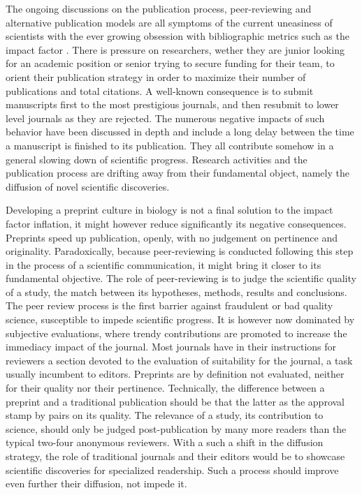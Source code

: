 \documentclass[letterpaper,twocolumn,superscriptaddress,showkeys,longbibliography]{revtex4-1}
\begin{document}
The ongoing discussions on the publication process, peer-reviewing and
alternative publication models are all symptoms of the current uneasiness of
scientists with the ever growing obsession with bibliographic metrics such as
the impact factor \cite{Fisher2012}. There is pressure on researchers, wether
they are junior looking for an academic position or senior trying to secure
funding for their team, to orient their publication strategy in order to
maximize their number of publications and total citations. A well-known
consequence is to submit manuscripts first to the most prestigious journals, and
then resubmit to lower level journals as they are rejected. The numerous
negative impacts of such behavior have been discussed in depth \cite{hoc09} and
include a long delay between the time a manuscript is finished to its
publication.  They all contribute somehow in a general slowing down of
scientific progress.  Research activities and the publication process are
drifting away from their fundamental object, namely the diffusion of novel
scientific discoveries. 

Developing a preprint culture in biology is not a final solution to the impact
factor inflation, it might however reduce significantly its negative
consequences. Preprints speed up publication, openly, with no judgement on
pertinence and originality. Paradoxically, because peer-reviewing is conducted
following this step in the process of a scientific communication, it might bring
it closer to its fundamental objective. The role of peer-reviewing is to judge
the scientific quality of a study, the match between its hypotheses, methods,
results and conclusions. The peer review process is the first barrier against
fraudulent or bad quality science, susceptible to impede scientific progress. It
is however now dominated by subjective evaluations, where trendy contributions
are promoted to increase the immediacy impact of the journal. Most journals have
in their instructions for reviewers a section devoted to the evaluation of
suitability for the journal, a task usually incumbent to editors. Preprints are
by definition not evaluated, neither for their quality nor their pertinence.
Technically, the difference between a preprint and a traditional publication
should be that the latter as the approval stamp by pairs on its quality. The
relevance of a study, its contribution to science, should only be judged
post-publication by many more readers than the typical two-four anonymous
reviewers. With a such a shift in the diffusion strategy, the role of
traditional journals and their editors would be to showcase scientific
discoveries for specialized readership. Such a process should improve even
further their diffusion, not impede it. 
\end{document}
